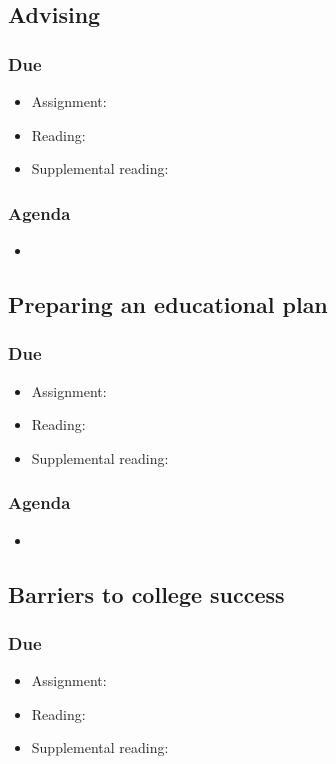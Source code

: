 \documentclass[12pt,article,oneside]{memoir}
\begin{document}
\subsection{Advising}
\subsubsection{Due}
\begin{itemize}
 \item Assignment: 
 \item Reading:
 \item Supplemental reading:
\end{itemize}

\subsubsection{Agenda}
\begin{itemize}
\item 
\end{itemize} 

\subsection{Preparing an educational plan}
\subsubsection{Due}
\begin{itemize}
 \item Assignment: 
 \item Reading:
 \item Supplemental reading:
\end{itemize}

\subsubsection{Agenda}
\begin{itemize}
\item 
\end{itemize}


\subsection{Barriers to college success}
\subsubsection{Due}
\begin{itemize}
 \item Assignment:
 \item Reading: \cite{guillory2008s}
 \item Supplemental reading: \cite{rosenberg}
\end{itemize}
\end{document}
